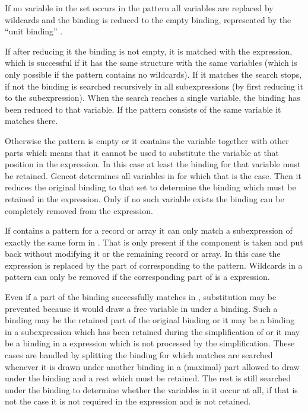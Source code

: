 If no variable in the set occurs in the pattern all variables are replaced by wildcards and the binding is reduced to the
empty binding, represented by the ``unit binding'' \code{() = ()}.

If after reducing it the binding is not empty, it is matched with the expression, which is successful if it has the same structure with the same
variables (which is only possible if the pattern contains no wildcards). If it matches the search stops, if not the binding 
is searched recursively in all subexpressions (by first reducing it to the subexpression). When the search reaches a single 
variable, the binding has been reduced to that variable. If the pattern consists of the same variable it matches there.

Otherwise the pattern is empty or it contains the variable together with other parts which means that it cannot be used to substitute the 
variable at that position in the expression. In this case at least the binding for that variable must be retained. Gencot 
determines all variables in  for which that is the case. Then it reduces the original binding 
to that set to determine the binding  which must be retained in the  expression. Only if no
such variable exists the binding can be completely removed from the  expression.

If  contains a  pattern for a record or array it can only match a  subexpression 
of exactly the same form in . That is only present if the component is taken and put back without modifying it or the 
remaining record or array. In this case the  expression is replaced by the part of  corresponding to 
the  pattern. Wildcards in a  pattern can only be removed if the corresponding part of 
is a  expression.

Even if a part of the binding successfully matches in , substitution may be prevented because it would draw a 
free variable in  under a binding. Such a binding may be the retained part of the original binding or it may 
be a binding in a  subexpression which has been retained during the simplification of 
or it may be a binding in a  expression which is not processed by the simplification. These cases are handled
by splitting the binding for which matches are searched whenever it is drawn under another binding in a (maximal) part allowed
to draw under the binding and a rest which must be retained. The rest is still searched under the binding to determine whether
the variables in it occur at all, if that is not the case it is not required in the expression and is not retained.

